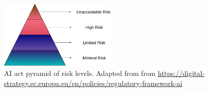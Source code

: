 \begin{figure}[H]
    \centering
    \includegraphics[width=0.5\textwidth]{fig/rel/images/AI_act_pyramid.pdf}
    \caption{AI act pyramid of risk levels. Adapted from from \url{https://digital-strategy.ec.europa.eu/en/policies/regulatory-framework-ai}}
    \label{fig:rel_AIact}
\end{figure}